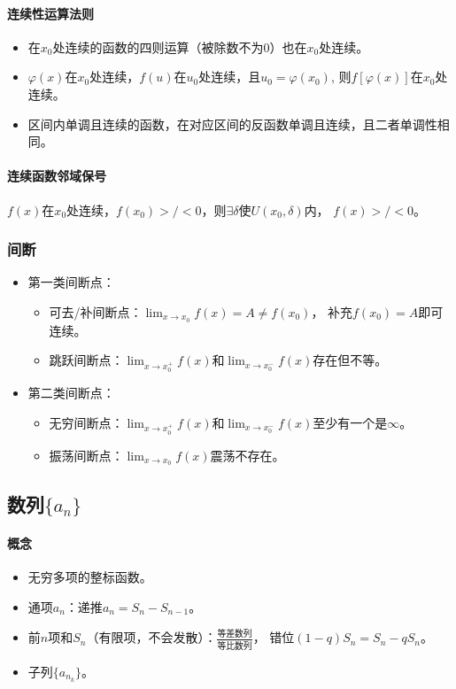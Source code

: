 \documentclass[
12pt, %
a4paper, 
oneside, %
headinclude,footinclude, %
]{scrartcl}
\begin{document}
\paragraph{连续性运算法则}
\begin{itemize}
\item 在$ x_0 $处连续的函数的四则运算（被除数不为$ 0 $）也在$ x_0 $处连续。
\item $ \varphi (x) $在$ x_0 $处连续，$ f(u) $在$ u_0 $处连续，且$ u_0 = \varphi (x_0) $,
则$ f[\varphi (x)] $在$ x_0 $处连续。
\item 区间内单调且连续的函数，在对应区间的反函数单调且连续，且二者单调性相同。
\end{itemize}
\paragraph{连续函数邻域保号}
$ f(x) $在$ x_0 $处连续，$ f(x_0) >/< 0 $，则$ \exists \delta $使$ U(x_0, \delta) $内，
$ f(x) >/< 0 $。
\subsubsection{间断}
\begin{itemize}
\item 第一类间断点：
\begin{itemize}
\item 可去/补间断点：$ \lim_{x \to x_0}f(x) = A \neq f(x_0) $，
补充$ f(x_0) = A $即可连续。
\item 跳跃间断点：$ \lim_{x \to x_0^+}f(x) $和$ \lim_{x \to x_0^-}f(x) $存在但不等。
\end{itemize}
\item 第二类间断点：
\begin{itemize}
\item 无穷间断点：$ \lim_{x \to x_0^+}f(x) $和$ \lim_{x \to x_0^-}f(x) $至少有一个是$ \infty $。
\item 振荡间断点：$ \lim_{x \to x_0}f(x) $震荡不存在。
\end{itemize}
\end{itemize}
\subsection{数列$ \{a_n\} $}
\paragraph{概念}
\begin{itemize}
\item 无穷多项的整标函数。
\item 通项$ a_n $：递推$ a_n = S_n - S_{n - 1} $。
\item 前$ n $项和$ S_n $（有限项，不会发散）：$ \frac{\text{等差数列}}{\text{等比数列}} $，
错位$ (1-q) S_n = S_n - q S_n $。
\item 子列$ \{a_{n_k}\} $。
\end{itemize}
\end{document}
